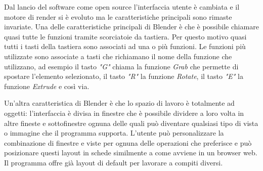 Dal lancio del software come open source l'interfaccia utente è cambiata e il motore di render si è evoluto ma le caratteristiche principali sono rimaste invariate.
%
Una delle caratteristiche principali di Blender è che è possibile chiamare quasi tutte le funzioni tramite scorciatoie da tastiera. 
%
Per questo motivo quasi tutti i tasti della tastiera sono associati ad una o più funzioni. 
%
Le funzioni più utilizzate sono associate a tasti che richiamano il nome della funzione che utilizzano, ad esempio il tasto \textit{"G"} chiama la funzione \textit{Grab} che permette di spostare l'elemento selezionato, il tasto \textit{"R"} la funzione \textit{Rotate}, il tasto \textit{"E"} la funzione \textit{Extrude} e così via.

Un'altra caratteristica di Blender è che lo spazio di lavoro è totalmente ad oggetti: l'interfaccia è divisa in finestre che è possibile dividere a loro volta in altre fineste e sottofinestre ognuna delle quali può diventare qualsiasi tipo di vista o immagine che il programma supporta.
%
L'utente può personalizzare la combinazione di finestre e viste per ognuna delle operazioni che preferisce e può posizionare questi layout in schede similmente a come avviene in un browser web.
%
Il programma offre già layout di default per lavorare a compiti diversi. 












